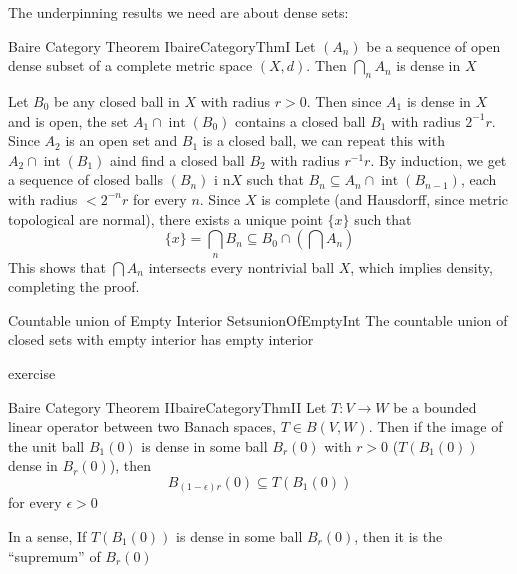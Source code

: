 \documentclass[oneside]{book}
\newcommand{\sse}{\subseteq}
\begin{document}
The underpinning results we need are about dense sets:

\begin{prop}{Baire Category Theorem I}{baireCategoryThmI}
	Let $(A_n)$ be a sequence of open dense subset of a complete metric space $(X,d)$. Then $\bigcap_n A_n$ is dense
	in $X$
\end{prop}

\begin{Proof}
	Let $B_0$ be any closed ball in $X$ with radius $r > 0$. Then since $A_1$ is dense in $X$ and is open, the
	set $A_1 \cap \operatorname{int}(B_0)$ contains a closed ball $B_1$ with radius $2^{-1}r$. Since $A_2$ is an
	open set and $B_1$ is a closed ball, we can repeat this with $A_2 \cap \operatorname{int}(B_1)$ aind find
	a closed ball $B_2$ with radius $r^{-1}r$. By induction, we get a sequence of closed balls $(B_n)$ i n$X$ such
	that $B_n \sse A_n \cap \operatorname{int}(B_{n-1})$, each with radius $< 2^{-n}r$ for every $n$. Since $X$ is
	complete (and Hausdorff, since metric topological are normal), there exists a unique point $\{x\}$ such that
	\[
		\{x\} = \bigcap_n B_n \sse B_0 \cap \left(\bigcap A_n\right)
	\]
	This shows that $\bigcap A_n$ intersects every nontrivial ball $X$, which implies density, completing the
	proof.
\end{Proof}

\begin{cor}{Countable union of Empty Interior Sets}{unionOfEmptyInt}
	The countable union of closed sets with empty interior has empty interior
\end{cor}

\begin{Proof}
	exercise
\end{Proof}


\begin{prop}{Baire Category Theorem II}{baireCategoryThmII}
	Let $T: V \to W$ be a bounded linear operator between two Banach spaces, $T \in B(V, W)$. Then if the image
	of the unit ball $B_1(0)$ is dense in some ball $B_r(0)$ with $r > 0$ ($T(B_1(0))$ dense in $B_r(0)$),
	then
	\[
		B_{( 1-\epsilon )r}(0) \sse T(B_1(0))
	\]
	for every $\epsilon > 0$
\end{prop}

In a sense, If $T(B_1(0))$ is dense in some ball $B_r(0)$, then it is the ``supremum'' of $B_r(0)$
\end{document}
